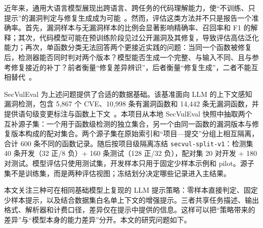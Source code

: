 \documentclass[conference]{IEEEtran}
\begin{document}
近年来，通用大语言模型展现出跨语言、跨任务的代码理解能力，使“不训练、只提示”的漏洞判定与修复生成成为可能~\cite{chen2021codex,pearce2023zeroshot}。然而，评估这类方法并不只是报告一个准确率。首先，漏洞样本与无漏洞样本的比例会显著影响精确率、召回率和 F1 的解释；其次，代码模型可能在预训练阶段见过公开漏洞及其修复，导致评估高估泛化能力；再次，单函数分类无法回答两个更接近实践的问题：当同一个函数被修复后，检测器能否同时判对两个版本？模型能否生成一个完整、与输入不同、且与参考修复接近的补丁？前者衡量“修复差异辨识”，后者衡量“修复生成”，二者不能互相替代~\cite{ding2025primevul,pearce2023zeroshot}。

SecVulEval 为上述问题提供了合适的数据基础。该基准面向 LLM 的上下文感知漏洞检测，包含 5{,}867 个 CVE、10{,}998 条有漏洞函数和 14{,}442 条无漏洞函数，并提供语句级变更标注与函数上下文~\cite{ahmed2026secvuleval,secvulevaldata}。本项目从本地 SecVulEval 快照中抽取两个互补源子集：一个用于函数级检测的独立集合，另一个由同一函数的漏洞版本与修复版本构成的配对集合。两个源子集在原始索引和“项目—提交”分组上相互隔离，合计 600 条不同的函数记录。随后按项目级隔离冻结 \texttt{secvul-split-v1}：检测集 40 条开发（32 正/8 负）+ 160 条测试（128 正/32 负），配对集 20 对开发 + 180 对测试。模型评估只使用测试集，开发样本只用于固定少样本示例和 pilot。源子集不是训练集，而是两种评估视图；冻结划分决定哪些记录进入主结果。

本文关注三种可在相同基础模型上复现的 LLM 提示策略：零样本直接判定、固定少样本提示，以及结合数据集白名单上下文的增强提示。三者共享任务描述、输出格式、解析器和计费口径，差异仅在提示中提供的信息。这样可以把“策略带来的差异”与“模型本身的能力差异”分开。本文的研究问题如下。
\end{document}
